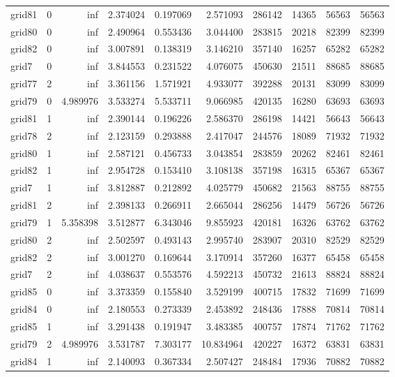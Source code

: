 \begin{longtable}{|l|r|r|r|r|r|r|r|r|r|}
grid81 & 0 & inf & 2.374024 & 0.197069 & 2.571093 & 286142 & 14365 & 56563 & 56563 \\
grid80 & 0 & inf & 2.490964 & 0.553436 & 3.044400 & 283815 & 20218 & 82399 & 82399 \\
grid82 & 0 & inf & 3.007891 & 0.138319 & 3.146210 & 357140 & 16257 & 65282 & 65282 \\
grid7 & 0 & inf & 3.844553 & 0.231522 & 4.076075 & 450630 & 21511 & 88685 & 88685 \\
grid77 & 2 & inf & 3.361156 & 1.571921 & 4.933077 & 392288 & 20131 & 83099 & 83099 \\
grid79 & 0 & 4.989976 & 3.533274 & 5.533711 & 9.066985 & 420135 & 16280 & 63693 & 63693 \\
grid81 & 1 & inf & 2.390144 & 0.196226 & 2.586370 & 286198 & 14421 & 56643 & 56643 \\
grid78 & 2 & inf & 2.123159 & 0.293888 & 2.417047 & 244576 & 18089 & 71932 & 71932 \\
grid80 & 1 & inf & 2.587121 & 0.456733 & 3.043854 & 283859 & 20262 & 82461 & 82461 \\
grid82 & 1 & inf & 2.954728 & 0.153410 & 3.108138 & 357198 & 16315 & 65367 & 65367 \\
grid7 & 1 & inf & 3.812887 & 0.212892 & 4.025779 & 450682 & 21563 & 88755 & 88755 \\
grid81 & 2 & inf & 2.398133 & 0.266911 & 2.665044 & 286256 & 14479 & 56726 & 56726 \\
grid79 & 1 & 5.358398 & 3.512877 & 6.343046 & 9.855923 & 420181 & 16326 & 63762 & 63762 \\
grid80 & 2 & inf & 2.502597 & 0.493143 & 2.995740 & 283907 & 20310 & 82529 & 82529 \\
grid82 & 2 & inf & 3.001270 & 0.169644 & 3.170914 & 357260 & 16377 & 65458 & 65458 \\
grid7 & 2 & inf & 4.038637 & 0.553576 & 4.592213 & 450732 & 21613 & 88824 & 88824 \\
grid85 & 0 & inf & 3.373359 & 0.155840 & 3.529199 & 400715 & 17832 & 71699 & 71699 \\
grid84 & 0 & inf & 2.180553 & 0.273339 & 2.453892 & 248436 & 17888 & 70814 & 70814 \\
grid85 & 1 & inf & 3.291438 & 0.191947 & 3.483385 & 400757 & 17874 & 71762 & 71762 \\
grid79 & 2 & 4.989976 & 3.531787 & 7.303177 & 10.834964 & 420227 & 16372 & 63831 & 63831 \\
grid84 & 1 & inf & 2.140093 & 0.367334 & 2.507427 & 248484 & 17936 & 70882 & 70882 \\

\end{longtable}
